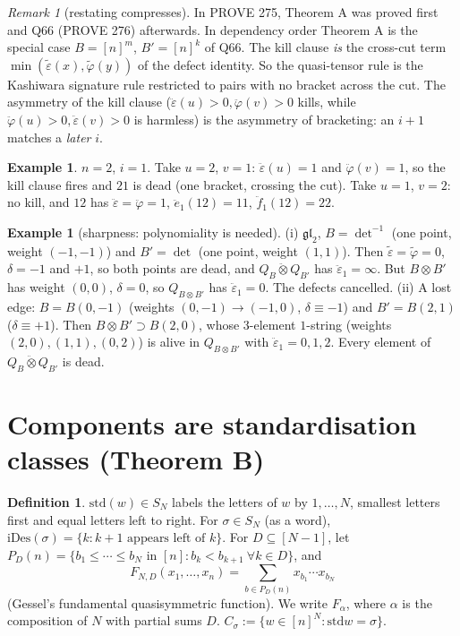 \documentclass[11pt]{amsart}
\theoremstyle{definition}
\newtheorem{definition}[theorem]{Definition}
\newtheorem{example}[theorem]{Example}
\theoremstyle{remark}
\newtheorem{remark}[theorem]{Remark}
\newcommand{\ee}{\ddot e}
\newcommand{\ff}{\ddot f}
\newcommand{\eps}{\ddot\varepsilon}
\newcommand{\vphi}{\ddot\varphi}
\newcommand{\teps}{\tilde\varepsilon}
\newcommand{\tphi}{\tilde\varphi}
\newcommand{\qt}{\mathbin{\ddot\otimes}}
\newcommand{\std}{\mathrm{std}}
\newcommand{\iDes}{\mathrm{iDes}}
\begin{document}
\begin{remark}[restating compresses]
In PROVE 275, Theorem A was proved first and Q66 (PROVE 276) afterwards. In dependency order Theorem A is the special case $B=[n]^m$, $B'=[n]^k$ of Q66. The kill clause \emph{is} the cross-cut term $\min(\teps(x),\tphi(y))$ of the defect identity. So the quasi-tensor rule is the Kashiwara signature rule restricted to pairs with no bracket across the cut. The asymmetry of the kill clause ($\eps(u)>0,\vphi(v)>0$ kills, while $\vphi(u)>0,\eps(v)>0$ is harmless) is the asymmetry of bracketing: an $i+1$ matches a \emph{later} $i$.
\end{remark}

\begin{example}
$n=2$, $i=1$. Take $u=2$, $v=1$: $\eps(u)=1$ and $\vphi(v)=1$, so the kill clause fires and $21$ is dead (one bracket, crossing the cut). Take $u=1$, $v=2$: no kill, and $12$ has $\eps=\vphi=1$, $\ee_1(12)=11$, $\ff_1(12)=22$.
\end{example}

\begin{example}[sharpness: polynomiality is needed]\label{ex:sharp}
(i) $\mathfrak{gl}_2$, $B=\det^{-1}$ (one point, weight $(-1,-1)$) and $B'=\det$ (one point, weight $(1,1)$). Then $\teps=\tphi=0$, $\delta=-1$ and $+1$, so both points are dead, and $Q_B\qt Q_{B'}$ has $\eps_1=\infty$. But $B\otimes B'$ has weight $(0,0)$, $\delta=0$, so $Q_{B\otimes B'}$ has $\eps_1=0$. The defects cancelled.
(ii) A lost edge: $B=B(0,-1)$ (weights $(0,-1)\to(-1,0)$, $\delta\equiv-1$) and $B'=B(2,1)$ ($\delta\equiv+1$). Then $B\otimes B'\supset B(2,0)$, whose $3$-element $1$-string (weights $(2,0),(1,1),(0,2)$) is alive in $Q_{B\otimes B'}$ with $\eps_1=0,1,2$. Every element of $Q_B\qt Q_{B'}$ is dead.
\end{example}

\section{Components are standardisation classes (Theorem B)}

\begin{definition}
$\std(w)\in S_N$ labels the letters of $w$ by $1,\dots,N$, smallest letters first and equal letters left to right. For $\sigma\in S_N$ (as a word), $\iDes(\sigma)=\{k:k+1\text{ appears left of }k\}$. For $D\subseteq[N-1]$, let $P_D(n)=\{b_1\le\cdots\le b_N\text{ in }[n]: b_k<b_{k+1}\ \forall k\in D\}$, and
\[F_{N,D}(x_1,\dots,x_n)=\sum_{b\in P_D(n)}x_{b_1}\cdots x_{b_N}\]
(Gessel's fundamental quasisymmetric function). We write $F_\alpha$, where $\alpha$ is the composition of $N$ with partial sums $D$. $C_\sigma:=\{w\in[n]^N:\std w=\sigma\}$.
\end{definition}
\end{document}
